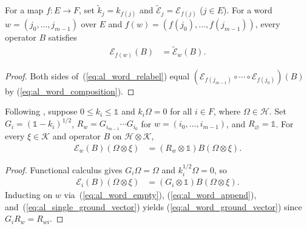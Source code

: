 \begin{lemma}
    \label{thm:al_channel_word_relabel}
    \leanok
    For a map $f:E\to F$, set $\widetilde k_j=k_{f(j)}$ and
    $\widetilde{\mathcal E}_j=\mathcal E_{f(j)}$ ($j\in E$). For a word
    $w=(j_0,\ldots,j_{m-1})$ over $E$ and $f(w)=(f(j_0),\ldots,f(j_{m-1}))$,
    every operator $B$ satisfies
    \begin{align}
        \label{eq:al_word_relabel}
        \mathcal E_{f(w)}(B) & =\widetilde{\mathcal E}_w(B).
    \end{align}
\end{lemma}
\begin{proof}
    \leanok
    Both sides of~(\ref{eq:al_word_relabel}) equal
    $(\mathcal E_{f(j_{m-1})}\circ\cdots\circ\mathcal E_{f(j_0)})(B)$ by
    (\ref{eq:al_word_composition}).
\end{proof}

\begin{lemma}
    \label{thm:al_channel_word_ground}
    \leanok
    Following \cite[Section~10]{OpenAI2026AreaLaw}, suppose
    $0\le k_i\le\mathbb 1$ and $k_i\Omega=0$ for all $i\in F$, where
    $\Omega\in\mathcal H$. Set $G_i=(\mathbb 1-k_i)^{1/2}$,
    $R_w=G_{i_{m-1}}\cdots G_{i_0}$ for $w=(i_0,\ldots,i_{m-1})$, and
    $R_{\varnothing}=\mathbb 1$. For every $\xi\in\mathcal K$ and operator $B$
    on $\mathcal H\otimes\mathcal K$,
    \begin{align}
        \label{eq:al_word_ground_vector}
        \mathcal E_w(B)(\Omega\otimes\xi)
         & =(R_w\otimes\mathbb 1)B(\Omega\otimes\xi).
    \end{align}
\end{lemma}
\begin{proof}
    \leanok
    Functional calculus gives $G_i\Omega=\Omega$ and $k_i^{1/2}\Omega=0$, so
    \begin{align}
        \label{eq:al_single_ground_vector}
        \mathcal E_i(B)(\Omega\otimes\xi)
         & =(G_i\otimes\mathbb 1)B(\Omega\otimes\xi).
    \end{align}
    Inducting on $w$ via~(\ref{eq:al_word_empty}), (\ref{eq:al_word_append}),
    and~(\ref{eq:al_single_ground_vector}) yields
    (\ref{eq:al_word_ground_vector}) since $G_iR_w=R_{wi}$.
\end{proof}

